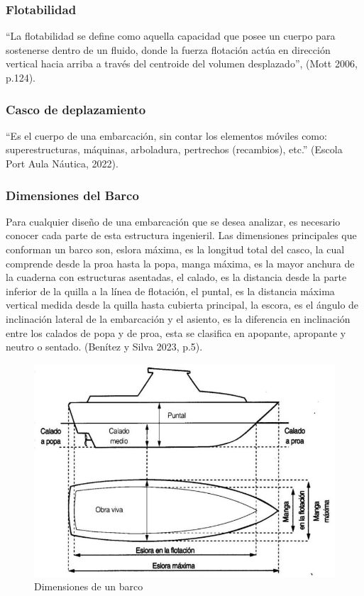 \documentclass[letterpaper]{article}
\begin{document}
\subsubsection{Flotabilidad}
\setlength{\parindent}{18pt}
``La flotabilidad se define como aquella capacidad que posee un cuerpo para sostenerse dentro de un fluido, 
donde la fuerza flotación actúa en dirección vertical hacia arriba a través del centroide del volumen 
desplazado'', (Mott 2006, p.124).
\subsubsection{Casco de deplazamiento}
\setlength{\parindent}{18pt}
``Es el cuerpo de una embarcación, sin contar los elementos móviles como: 
superestructuras, máquinas, arboladura, pertrechos (recambios), etc.'' (Escola Port Aula Náutica, 2022).
\subsubsection{Dimensiones del Barco}
\setlength{\parindent}{18pt}
Para cualquier diseño de una embarcación que se desea analizar, es necesario conocer cada parte de esta 
estructura ingenieril. Las dimensiones principales que conforman un barco son, eslora máxima, es la longitud 
total del casco, la cual comprende desde la proa hasta la popa, manga máxima, es la mayor anchura de la 
cuaderna con estructuras asentadas, el calado, es la distancia desde la parte inferior de la quilla a la 
línea de flotación, el puntal, es la distancia máxima vertical medida desde la quilla hasta cubierta 
principal, la escora, es el ángulo de inclinación lateral de la embarcación y el asiento, es la diferencia
 en inclinación entre los calados de popa y de proa, esta se clasifica en apopante, 
 apropante y neutro o sentado. (Benítez y Silva 2023, p.5).
 \begin{figure}[h]
	\centering
	\includegraphics[width=0.8 \textwidth]{dimensionestemporal.jpg}
	\caption{ Dimensiones de un barco}
	\label{fig:imagen00}
\end{figure}
\newpage
\end{document}
